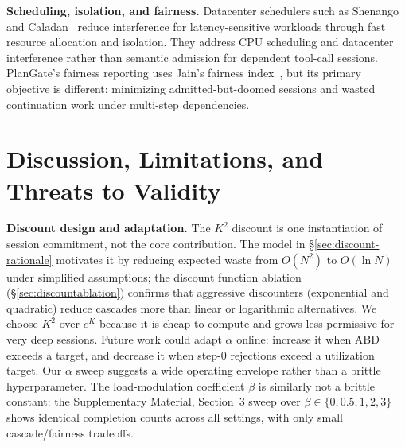 \documentclass[sigconf,review,anonymous]{acmart}
\begin{document}
\textbf{Scheduling, isolation, and fairness.} Datacenter schedulers such as Shenango~\cite{shenango} and Caladan~\cite{caladan} reduce interference for latency-sensitive workloads through fast resource allocation and isolation. They address CPU scheduling and datacenter interference rather than semantic admission for dependent tool-call sessions. PlanGate's fairness reporting uses Jain's fairness index~\cite{jain_fairness}, but its primary objective is different: minimizing admitted-but-doomed sessions and wasted continuation work under multi-step dependencies.

\section{Discussion, Limitations, and Threats to Validity}

\textbf{Discount design and adaptation.}
The $K^2$ discount is one instantiation of session commitment, not the core contribution. The model in \S\ref{sec:discount-rationale} motivates it by reducing expected waste from $O(N^2)$ to $O(\ln N)$ under simplified assumptions; the discount function ablation (\S\ref{sec:discountablation}) confirms that aggressive discounters (exponential and quadratic) reduce cascades more than linear or logarithmic alternatives. We choose $K^2$ over $e^K$ because it is cheap to compute and grows less permissive for very deep sessions. Future work could adapt $\alpha$ online: increase it when ABD exceeds a target, and decrease it when step-0 rejections exceed a utilization target. Our $\alpha$ sweep suggests a wide operating envelope rather than a brittle hyperparameter. The load-modulation coefficient $\beta$ is similarly not a brittle constant: the Supplementary Material, Section~3 sweep over $\beta\in\{0,0.5,1,2,3\}$ shows identical completion counts across all settings, with only small cascade/fairness tradeoffs.
\end{document}
